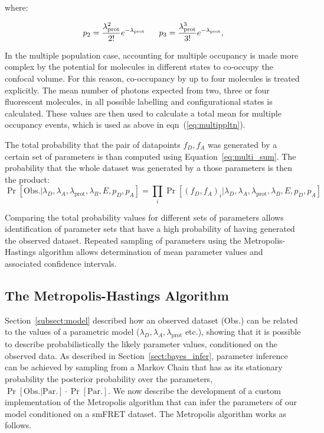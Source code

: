 where:

\begin{equation}
\footnotesize
p_2 = \frac{\lambda_{\text{prot}}^2}{2!}e^{-\lambda_{\text{prot}}} \qquad
p_3 = \frac{\lambda_{\text{prot}}^3}{3!}e^{-\lambda_{\text{prot}}} ,
\end{equation}

In the multiple population case, accounting for multiple occupancy is made more complex by the potential for molecules in different states to co-occupy the confocal volume. For this reason, co-occupancy by up to four molecules is treated explicitly. The mean number of photons expected from two, three or four fluorescent molecules, in all possible labelling and configurational states is calculated. These values are then used to calculate a total mean for multiple occupancy events, which is used as above in eqn~(\ref{eq:multippltn}). 

The total probability that the pair of datapoints $f_D, f_A$ was generated by a certain set of parameters is than computed using Equation~\ref{eq:multi_sum}. The probability that the whole dataset was generated by a those parameters is then the product:
\begin{equation}
\Pr[\text{Obs.}|\lambda_D, \lambda_A, \lambda_{\text{prot}}, \lambda_B, E, p_D, p_A] = \prod_i \Pr[(f_D, f_A)_i |\lambda_D, \lambda_A, \lambda_{\text{prot}}, \lambda_B, E, p_D, p_A]
\end{equation}

Comparing the total probability values for different sets of parameters allows identification of parameter sets that have a high probability of having generated the observed dataset. Repeated sampling of parameters using the Metropolis-Hastings algorithm allows determination of mean parameter values and associated confidence intervals.  

\subsection{The Metropolis-Hastings Algorithm}

Section~\ref{subsect:model} described how an observed dataset (Obs.) can be related to the values of a parametric model ($\lambda_D, \lambda_A, \lambda_{\text{prot}}$ etc.), showing that it is possible to describe probabilistically the likely parameter values, conditioned on the observed data. As described in Section~\ref{sect:bayes_infer}, parameter inference can be achieved by sampling from a Markov Chain that has as its stationary probability the posterior probability over the parameters, $\Pr[\text{Obs.} | \text{Par.}] \cdot \Pr[\text{Par.}]$. We now describe the development of a custom implementation of the Metropolis algorithm that can infer the parameters of our model conditioned on a smFRET dataset. The Metropolis algorithm works as follows.


